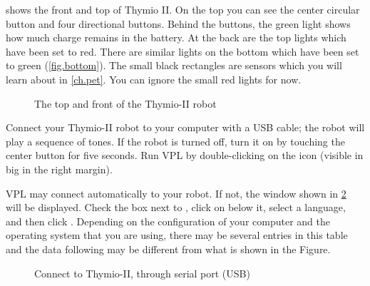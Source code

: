 

 shows the front and top of Thymio II. On the
top you can see the center circular button and four directional buttons.
Behind the buttons, the green light shows how much charge remains in the
battery. At the back are the top lights which have been set to red.
There are similar lights on the bottom which have been set to green
(\cref{fig.bottom}). The small black rectangles are sensors which
you will learn about in \cref{ch.pet}. You can ignore the small
red lights for now.

\begin{figure}[h]
\begin{center}
\caption{The top and front of the Thymio-II robot}\label{fig.front}
\end{center}
\end{figure}

\pagebreak


Connect your Thymio-II robot to your computer with a USB cable; the robot will play a sequence of tones.
If the robot is turned off, turn it on by touching the center
button for five seconds. Run VPL by double-clicking on the icon
 (visible in big in the right margin).

VPL may connect automatically to your robot.
If not, the window shown in \cref{fig.connect} will be
displayed. Check the box next to , click on  below it, select a language, and then click
.
Depending on the configuration of your computer
and the operating system that you are using, there may be several
entries in this table and the data following  may be
different from what is shown in the Figure.

\vfill


\begin{figure}
\begin{center}
\caption{Connect to Thymio-II, through serial port (USB)}\label{fig.connect}
\end{center}
\end{figure}

